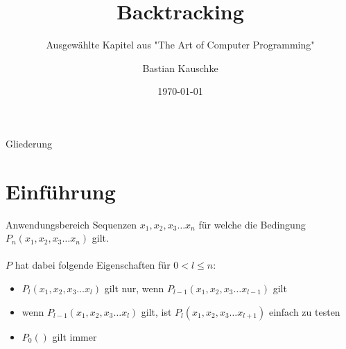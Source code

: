 \documentclass[aspectratio=43,t]{beamer}
\title[Backtracking]{Backtracking}
\subtitle{Ausgewählte Kapitel aus "The Art of Computer Programming"}
\author[Bastian Kauschke]{Bastian Kauschke}
\institute[Hardware-Software-Co-Design]{Hardware-Software-Co-Design, Friedrich-Alexander-Universität Erlangen-Nürnberg}
\date{\today}
\begin{document}
  \maketitle

  { %
    \begin{frame}[noframenumbering]{Gliederung}
      \tableofcontents
    \end{frame}
  }

  \section{Einführung}
  \begin{frame}{Anwendungsbereich}
    Sequenzen $x_{1}, x_{2}, x_{3} \dots x_{n}$ für welche die Bedingung $P_{n}(x_{1}, x_{2}, x_{3} \dots x_{n})$ gilt.\\
    \ \\ 
    $P$ hat dabei folgende Eigenschaften für $0 < l \leq n$: \pause
    \begin{itemize}
      \item $P_{l}(x_{1}, x_{2}, x_{3} \dots x_{l})$ gilt nur, wenn $P_{l-1}(x_{1}, x_{2}, x_{3} \dots x_{l-1})$ gilt \pause
      \item wenn $P_{l-1}(x_{1}, x_{2}, x_{3} \dots x_{l})$ gilt, ist $P_{l}(x_{1}, x_{2}, x_{3} \dots x_{l+1})$ einfach zu testen \pause
      \item $P_{0}()$ gilt immer
    \end{itemize}
  \end{frame}
\end{document}

